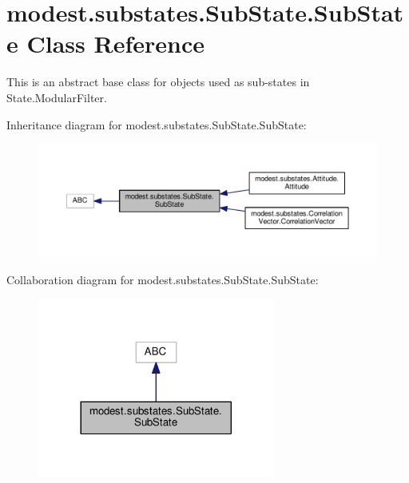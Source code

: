 \hypertarget{classmodest_1_1substates_1_1SubState_1_1SubState}{}\section{modest.\+substates.\+Sub\+State.\+Sub\+State Class Reference}
\label{classmodest_1_1substates_1_1SubState_1_1SubState}


This is an abstract base class for objects used as sub-\/states in State.\+Modular\+Filter.  




Inheritance diagram for modest.\+substates.\+Sub\+State.\+Sub\+State\+:\nopagebreak
\begin{figure}[H]
\begin{center}
\leavevmode
\includegraphics[width=350pt]{classmodest_1_1substates_1_1SubState_1_1SubState__inherit__graph}
\end{center}
\end{figure}


Collaboration diagram for modest.\+substates.\+Sub\+State.\+Sub\+State\+:\nopagebreak
\begin{figure}[H]
\begin{center}
\leavevmode
\includegraphics[width=221pt]{classmodest_1_1substates_1_1SubState_1_1SubState__coll__graph}
\end{center}
\end{figure}
